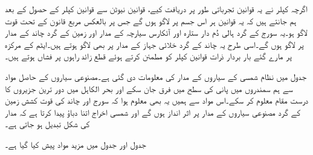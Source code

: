اگرچہ کپلر نے یہ قوانین تجرباتی طور پر  دریافت کیے، قوانین نیوٹن سے قوانین کپلر  کے حصول کے بعد ہم جانتے ہیں کہ یہ قوانین ہر اس جسم پر لاگو ہوں گے جس  پر  بالعکس مربع  قانون کے تحت  قوت لاگو ہو۔یہ سورج کے گرد  ہالی دُم دار ستارہ اور   آئکارس سیارچہ کے   مدار   اور زمین کے گرد چاند  کے مدار پر لاگو ہوں گے۔اسی طرح یہ چاند کے گرد  خلائی جہاز  کے مدار پر بھی لاگو ہوتے ہیں۔ایٹم کے مرکزہ   پر مارے گئے  بار بردار ذرات قوانین کپلر  کو مطمئن کرتے ہوئے قطع زائد راہوں پر فشاں ہوتے ہیں۔

جدول  میں نظام شمسی کے    سیاروں کے مدار کی معلومات دی گئی ہے۔مصنوعی سیاروں کے حاصل مواد سے ہم  سمندروں میں پانی کی سطح میں فرق جان سکے اور  بحر الکاہل میں  دور ترین جزیروں  کا درست مقام معلوم کر سکے۔اس مواد سے ہمیں یہ بھی معلوم ہوا کہ سورج اور چاند کی قوت کشش  زمین کے گرد مصنوعی سیاروں کے مدار پر  اثر انداز ہوں گے اور شمسی  اخراج اتنا دباؤ پیدا کرتا ہے کہ مدار    کی شکل تبدیل ہو جاتی ہے۔

جدول  اور جدول   میں مزید مواد  پیش کیا گیا ہے۔


